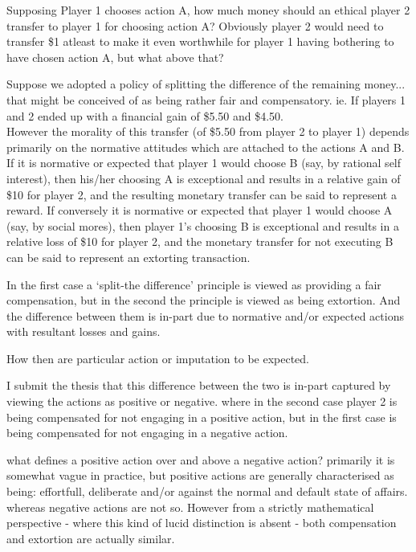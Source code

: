 Supposing Player 1 chooses action A, how much money should an ethical player 2 transfer to player 1 for choosing action A?
Obviously player 2 would need to transfer \$1 atleast to make it even worthwhile for player 1 having bothering to have chosen action A, but what above that?

Suppose we adopted a policy of splitting the difference of the remaining money... that might be conceived of as being rather fair and compensatory. ie. If players 1 and 2 ended up with a financial gain of \$5.50 and \$4.50.\\

However the morality of this transfer (of \$5.50 from player 2 to player 1) depends primarily on the normative attitudes which are attached to the actions A and B.\\

If it is normative or expected that player 1 would choose B (say, by rational self interest), then his/her choosing A is exceptional and results in a relative gain of \$10 for player 2, and the resulting monetary transfer can be said to represent a reward.
If conversely it is normative or expected that player 1 would choose A (say, by social mores), then player 1's choosing B is exceptional and results in a relative loss of \$10 for player 2, and the monetary transfer for not executing B can be said to represent an extorting transaction.

In the first case a `split-the difference' principle is viewed as providing a fair compensation, but in the second the principle is viewed as being extortion.
And the difference between them is in-part due to normative and/or expected actions with resultant losses and gains.

How then are particular action or imputation to be expected.

I submit the thesis that this difference between the two is in-part captured by viewing the actions as positive or negative. where in the second case player 2 is being compensated for not engaging in a positive action, but in the first case is being compensated for not engaging in a negative action.

what defines a positive action over and above a negative action?
primarily it is somewhat vague in practice, but positive actions are generally characterised as being: effortfull, deliberate and/or against the normal and default state of affairs. whereas negative actions are not so.
However from a strictly mathematical perspective - where this kind of lucid distinction is absent - both compensation and extortion are actually similar.

